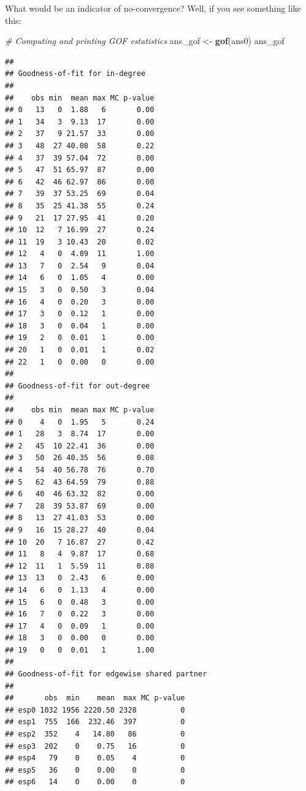 \documentclass[]{book}
\newenvironment{Shaded}{\begin{snugshade}}{\end{snugshade}}
\newcommand{\KeywordTok}[1]{\textcolor[rgb]{0.13,0.29,0.53}{\textbf{#1}}}
\newcommand{\StringTok}[1]{\textcolor[rgb]{0.31,0.60,0.02}{#1}}
\newcommand{\CommentTok}[1]{\textcolor[rgb]{0.56,0.35,0.01}{\textit{#1}}}
\newcommand{\NormalTok}[1]{#1}
\theoremstyle{definition}
\theoremstyle{definition}
\theoremstyle{definition}
\theoremstyle{remark}
\begin{document}
What would be an indicator of no-convergence? Well, if you see something
like this:

\begin{Shaded}
\begin{Highlighting}[]
\CommentTok{# Computing and printing GOF estatistics}
\NormalTok{ans_gof <-}\StringTok{ }\KeywordTok{gof}\NormalTok{(ans0)}
\NormalTok{ans_gof}
\end{Highlighting}
\end{Shaded}

\begin{verbatim}
## 
## Goodness-of-fit for in-degree 
## 
##    obs min  mean max MC p-value
## 0   13   0  1.88   6       0.00
## 1   34   3  9.13  17       0.00
## 2   37   9 21.57  33       0.00
## 3   48  27 40.08  58       0.22
## 4   37  39 57.04  72       0.00
## 5   47  51 65.97  87       0.00
## 6   42  46 62.97  86       0.00
## 7   39  37 53.25  69       0.04
## 8   35  25 41.38  55       0.24
## 9   21  17 27.95  41       0.20
## 10  12   7 16.99  27       0.24
## 11  19   3 10.43  20       0.02
## 12   4   0  4.89  11       1.00
## 13   7   0  2.54   9       0.04
## 14   6   0  1.05   4       0.00
## 15   3   0  0.50   3       0.04
## 16   4   0  0.20   3       0.00
## 17   3   0  0.12   1       0.00
## 18   3   0  0.04   1       0.00
## 19   2   0  0.01   1       0.00
## 20   1   0  0.01   1       0.02
## 22   1   0  0.00   0       0.00
## 
## Goodness-of-fit for out-degree 
## 
##    obs min  mean max MC p-value
## 0    4   0  1.95   5       0.24
## 1   28   3  8.74  17       0.00
## 2   45  10 22.41  36       0.00
## 3   50  26 40.35  56       0.08
## 4   54  40 56.78  76       0.70
## 5   62  43 64.59  79       0.88
## 6   40  46 63.32  82       0.00
## 7   28  39 53.87  69       0.00
## 8   13  27 41.03  53       0.00
## 9   16  15 28.27  40       0.04
## 10  20   7 16.87  27       0.42
## 11   8   4  9.87  17       0.68
## 12  11   1  5.59  11       0.08
## 13  13   0  2.43   6       0.00
## 14   6   0  1.13   4       0.00
## 15   6   0  0.48   3       0.00
## 16   7   0  0.22   3       0.00
## 17   4   0  0.09   1       0.00
## 18   3   0  0.00   0       0.00
## 19   0   0  0.01   1       1.00
## 
## Goodness-of-fit for edgewise shared partner 
## 
##       obs  min    mean  max MC p-value
## esp0 1032 1956 2220.50 2328          0
## esp1  755  166  232.46  397          0
## esp2  352    4   14.80   86          0
## esp3  202    0    0.75   16          0
## esp4   79    0    0.05    4          0
## esp5   36    0    0.00    0          0
## esp6   14    0    0.00    0          0

\end{verbatim}
\end{document}
